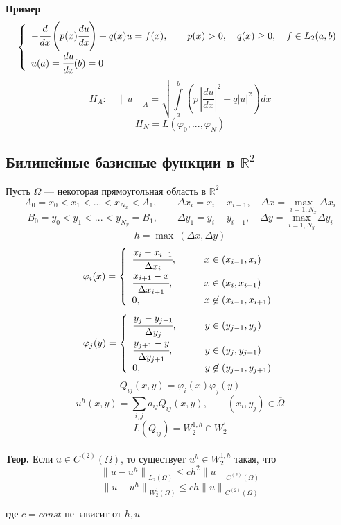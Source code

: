 \documentclass[12pt, a4paper]{article}
\newcommand{\Int}{\int\limits}
\newcommand{\Sum}{\sum\limits}
\begin{document}
\textbf{Пример}
\[
\left\{
\begin{array}{l}
    - \cfrac{d}{dx} \left(p(x) \cfrac{du}{dx} \right) + q(x) u = f(x), \qquad p(x) >0, \quad q(x) \geq 0, \quad f \in L_2(a, b) \\
    u(a) = \cfrac{du}{dx}(b) = 0
\end{array}
\right.
\]
\[ H_A: \quad {\|u\|}_A = \sqrt{\Int_{a}^{b} \left(p \, {\left|\frac{du}{dx}\right|}^2+q {\left| u \right|}^2 \right) dx} \]
\[ H_N = L (\varphi_0, ..., \varphi_N) \]

\subsection{Билинейные базисные функции в $\mathbb{R}^2$}

Пусть $\Omega$ --- некоторая прямоугольная область в $\mathbb{R}^2$
\[ A_0 = x_0 < x_1 < ... < x_{N_x} < A_1, \qquad \Delta x_i = x_i - x_{i-1}, \quad \Delta x = \underset{i=1, N_x}{\max} \Delta x_i \]
\[ B_0 = y_0 < y_1 < ... < y_{N_y} = B_1, \qquad \Delta y_1 = y_i - y_{i-1}, \quad \Delta y = \underset{i=1, N_y}{\max} \Delta y_i \]
\[ h = \max \ (\Delta x, \Delta y) \]
\[ \varphi_i(x) =
\left\{
\begin{array}{ll}
    \cfrac{x_i - x_{i-1}}{\Delta x_i}, \qquad & x \in (x_{i-1}, x_i) \\
    \cfrac{x_{i+1} - x}{\Delta x_{i+1}}, \qquad & x \in (x_i, x_{i+1}) \\
    0, \qquad & x \not \in (x_{i-1}, x_{i+1})
\end{array}
\right.
\]
\[ \varphi_j(y) =
\left\{
\begin{array}{ll}
	\cfrac{y_j - y_{j-1}}{\Delta y_j}, \qquad & y \in (y_{j-1}, y_j) \\
	\cfrac{y_{j+1} - y}{\Delta y_{j+1}}, \qquad & y \in (y_j, y_{j+1}) \\
	0, \qquad & y \not \in (y_{j-1}, y_{j+1})
\end{array}
\right.
\]
\[ Q_{ij} (x, y) = \varphi_i(x) \varphi_j(y) \]
\[ u^h(x,y) = \Sum_{i, j} a_{ij} Q_{ij}(x, y), \qquad (x_i, y_j) \in \overline{\Omega} \]
\[ L(Q_{ij}) = W_2^{1, h} \cap W_2^1 \] \\

\textbf{Теор.} Если $ u \in C^{(2)} (\Omega)$, то существует  $u^h \in W^{1, h}_2$ такая, что
\[ {\|u - u^h\|}_{L_2(\Omega)} \leq c h^2 {\|u\|}_{C^{(2)} (\Omega)} \]
\[ {\|u-u^h\|}_{W_2^1(\Omega)} \leq c h {\| u \|}_{C^{(2)} (\Omega)} \]

где $c = const$ не зависит от $h, u$ \\
\end{document}
